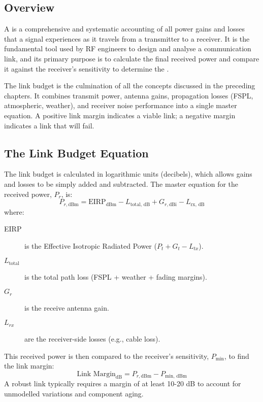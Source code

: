 \subsection{Overview}

A  is a comprehensive and systematic accounting of all power gains and losses that a signal experiences as it travels from a transmitter to a receiver. It is the fundamental tool used by RF engineers to design and analyse a communication link, and its primary purpose is to calculate the final received power and compare it against the receiver's sensitivity to determine the .

\begin{keyconcept}
    The link budget is the culmination of all the concepts discussed in the preceding chapters. It combines transmit power, antenna gains, propagation losses (FSPL, atmospheric, weather), and receiver noise performance into a single master equation. A positive link margin indicates a viable link; a negative margin indicates a link that will fail.
\end{keyconcept}


\subsection{The Link Budget Equation}

The link budget is calculated in logarithmic units (decibels), which allows gains and losses to be simply added and subtracted. The master equation for the received power, $P_r$, is:
\begin{equation}
    P_{r, \text{dBm}} = \text{EIRP}_{\text{dBm}} - L_{\text{total, dB}} + G_{r, \text{dBi}} - L_{\text{rx, dB}}
\end{equation}
where:
\begin{description}
    \item[EIRP] is the Effective Isotropic Radiated Power ($P_t + G_t - L_{tx}$).
    \item[$L_{\text{total}}$] is the total path loss (FSPL + weather + fading margins).
    \item[$G_r$] is the receive antenna gain.
    \item[$L_{rx}$] are the receiver-side losses (e.g., cable loss).
\end{description}
This received power is then compared to the receiver's sensitivity, $P_{\text{min}}$, to find the link margin:
\begin{equation}
    \text{Link Margin}_{\text{dB}} = P_{r, \text{dBm}} - P_{\text{min, dBm}}
\end{equation}
A robust link typically requires a margin of at least 10-20 dB to account for unmodelled variations and component aging.


